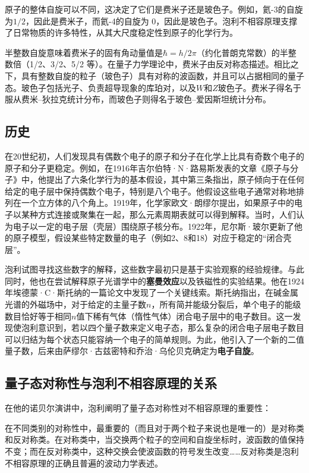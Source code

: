 原子的整体自旋可以不同，这决定了它们是费米子还是玻色子。例如，氦-3的自旋为\(1/2 \)，因此是费米子，而氦-4的自旋为 0，因此是玻色子。泡利不相容原理支撑了日常物质的许多特性，从其大尺度稳定性到原子的化学行为。

半整数自旋意味着费米子的固有角动量值是\( \hbar = h / 2\pi \)（约化普朗克常数）的半整数倍（1/2、3/2、5/2 等）。在量子力学理论中，费米子由反对称态描述。相比之下，具有整数自旋的粒子（玻色子）具有对称的波函数，并且可以占据相同的量子态。玻色子包括光子、负责超导现象的库珀对，以及\(W\)和\(Z\)玻色子。费米子得名于服从费米–狄拉克统计分布，而玻色子则得名于玻色–爱因斯坦统计分布。
\subsection{历史}  
在20世纪初，人们发现具有偶数个电子的原子和分子在化学上比具有奇数个电子的原子和分子更稳定。例如，在1916年吉尔伯特·N·路易斯发表的文章《原子与分子》中，他提出了六条化学行为的基本假设，其中第三条指出，原子倾向于在任何给定的电子层中保持偶数个电子，特别是八个电子。他假设这些电子通常对称地排列在一个立方体的八个角上。1919年，化学家欧文·朗缪尔提出，如果原子中的电子以某种方式连接或聚集在一起，那么元素周期表就可以得到解释。当时，人们认为电子以一定的电子层（壳层）围绕原子核分布。1922年，尼尔斯·玻尔更新了他的原子模型，假设某些特定数量的电子（例如2、8和18）对应于稳定的“闭合壳层”。

泡利试图寻找这些数字的解释，这些数字最初只是基于实验观察的经验规律。与此同时，他也在尝试解释原子光谱学中的\textbf{塞曼效应}以及铁磁性的实验结果。他在1924年埃德蒙·C·斯托纳的一篇论文中发现了一个关键线索。斯托纳指出，在碱金属光谱的外磁场中，对于给定的主量子数\( n \)，所有简并能级分裂后，单个电子的能级数目恰好等于相同\( n \)值下稀有气体（惰性气体）闭合电子层中的电子数目。这一发现使泡利意识到，若以四个量子数来定义电子态，那么复杂的闭合电子层电子数目可以归结为每个状态只能容纳一个电子的简单规则。为此，他引入了一个新的二值量子数，后来由萨缪尔·古兹密特和乔治·乌伦贝克确定为\textbf{电子自旋}。
\subsection{量子态对称性与泡利不相容原理的关系}  
在他的诺贝尔演讲中，泡利阐明了量子态对称性对不相容原理的重要性：  

在不同类别的对称性中，最重要的（而且对于两个粒子来说也是唯一的）是对称类和反对称类。在对称类中，当交换两个粒子的空间和自旋坐标时，波函数的值保持不变；而在反对称类中，这种交换会使波函数的符号发生改变……反对称类是泡利不相容原理的正确且普遍的波动力学表述。


